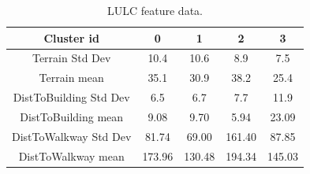 \documentclass[a4paper,fleqn]{cas-sc}
\begin{document}
\begin{table}[width=.45\linewidth,pos=h]
    \caption{LULC feature data.}
    \label{tab:LULC_label}
    \centering
    \begin{tabular}{c | c c c c}
    \toprule
         Cluster id & 0 & 1 & 2 & 3 \\
    \midrule
         Terrain Std Dev& 10.4 & 10.6 & 8.9 & 7.5 \\
         Terrain mean& 35.1 & 30.9 & 38.2 & 25.4 \\
         DistToBuilding Std Dev& 6.5 & 6.7 & 7.7 & 11.9 \\
         DistToBuilding mean& 9.08 & 9.70 & 5.94 & 23.09 \\
         DistToWalkway Std Dev& 81.74 & 69.00 & 161.40 & 87.85 \\
         DistToWalkway mean& 173.96 & 130.48 & 194.34 & 145.03 \\
         \bottomrule
    \end{tabular}
\end{table}

\end{document}
